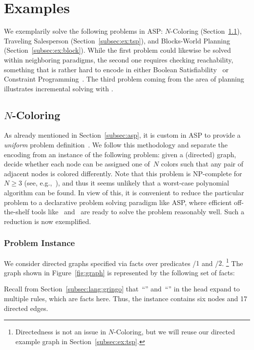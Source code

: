 \section{Examples}\label{sec:examples}

We exemplarily solve the following problems in ASP:
$N$-Coloring (Section~\ref{subsec:ex:color}),
Traveling Salesperson (Section~\ref{subsec:ex:tsp}), and
Blocks-World Planning (Section~\ref{subsec:ex:block}).
While the first problem could likewise be solved within neighboring paradigms,
the second one requires checking reachability,
something that is rather hard to encode in either
Boolean Satisfiability~\cite{bihemawa08a} or
Constraint Programming~\cite{robewa06a}.
The third problem coming from the area of planning
illustrates incremental solving with \iclingo.
 

\subsection{$N$-Coloring}\label{subsec:ex:color}

As already mentioned in Section~\ref{subsec:asp},
it is custom in ASP to provide a \emph{uniform}
problem definition~\cite{martru99a,niemela99a,schlipf95a}.
We follow this methodology and separate the encoding
from an instance of the following problem:
given a (directed) graph, decide whether each node can be assigned
one of~$N$ colors such that any pair of adjacent nodes is colored differently.
Note that this problem is NP-complete for~$N\geq 3$
(see, e.g.,~\cite{papadimitriou94a}),
and thus it seems unlikely that a worst-case polynomial algorithm
can be found.
In view of this,
it is convenient to reduce the particular problem to
a declarative problem solving paradigm like ASP,
where efficient off-the-shelf tools like \gringo\ and \clasp\
are ready to solve the problem reasonably well.
Such a reduction is now exemplified.

\subsubsection{Problem Instance}\label{subsec:color:instance}


We consider directed graphs specified via facts over predicates
/$1$ and /$2$.%
\footnote{%
  Directedness is not an issue in $N$-Coloring,
  but we will reuse our directed example graph in Section~\ref{subsec:ex:tsp}.}
The graph shown in Figure~\ref{fig:graph} is represented by the following set of facts:
%

%
Recall from Section~\ref{subsec:lang:gringo} that~``'' and~``\code{;}''
in the head expand to multiple rules, which are facts here.
Thus, the instance contains six nodes and 17 directed edges.

